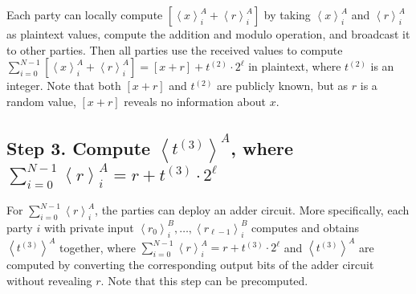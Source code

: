 Each party can locally compute $ \left[\left\langle x\right\rangle ^A_i+\left\langle r\right\rangle^A_i\right]    $ by taking $\left\langle x\right\rangle ^A_i$ and $\left\langle r\right\rangle^A_i$ as plaintext values, compute the addition and modulo operation, and broadcast it to other parties. Then all parties use the received values to compute $\sum_{i = 0}^{N-1}\left[ \left\langle x\right\rangle ^A_i+\left\langle r\right\rangle^A_i  \right]  = \left[x+r  \right]   + t^{(2)}\cdot 2^{\ell} $ in plaintext, where $t^{(2)}$ is an integer. Note that both $ \left[x+r \right]  $ and $t^{(2)}$ are publicly known, but as $r$ is a random value, $ \left[x+r \right]  $ reveals no information about $x$.


\subsection{Step 3. Compute $\left\langle t^{\left(3\right) }\right\rangle^A$, where $\sum_{i = 0}^{N-1}\left\langle r\right\rangle^A_i=r+  t^{\left(3\right) } \cdot 2^{\ell}$}
\label{wrap:step3}

For $\sum_{i = 0}^{N-1}\left\langle r\right\rangle^A_i$, the parties can deploy an adder circuit. More specifically, each party $i$ with private input $ \left\langle r_0\right\rangle^B_i,\ldots,  \left\langle r_{\ell-1}\right\rangle^B_{i} $ computes and obtains $ \left\langle t^{\left(3\right) }\right\rangle^A$ together, where $\sum_{i = 0}^{N-1} \left\langle r \right\rangle ^A_i=r+   t^{\left(3\right) }  \cdot 2^{\ell} $ and $ \left\langle t^{\left(3\right) }\right\rangle^A$ are computed by converting the corresponding output bits of the adder circuit without revealing $r$. Note that this step can be precomputed.

